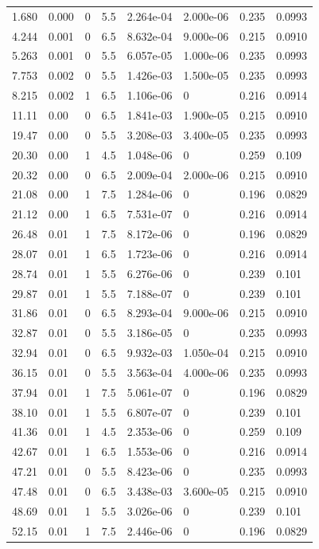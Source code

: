 \documentclass[preview]{standalone}
\begin{document}
{{\begin{tabular}{L{1.2cm}C{1.2cm} C{0.3cm}C{0.5cm} C{1.4cm}C{1.4cm} C{1.4cm}C{1.4cm}}
  1.680  &  0.000  & 0     & 5.5 &  2.264e-04  & 2.000e-06  & 0.235 &  0.0993   \\ 
  4.244  &  0.001  & 0     & 6.5 &  8.632e-04  & 9.000e-06  & 0.215 &  0.0910   \\ 
  5.263  &  0.001  & 0     & 5.5 &  6.057e-05  & 1.000e-06  & 0.235 &  0.0993   \\ 
  7.753  &  0.002  & 0     & 5.5 &  1.426e-03  & 1.500e-05  & 0.235 &  0.0993   \\ 
  8.215  &  0.002  & 1     & 6.5 &  1.106e-06  & 0  & 0.216 &  0.0914   \\ 
  11.11  &  0.00  & 0     & 6.5 &  1.841e-03  & 1.900e-05  & 0.215 &  0.0910   \\ 
  19.47  &  0.00  & 0     & 5.5 &  3.208e-03  & 3.400e-05  & 0.235 &  0.0993   \\ 
  20.30  &  0.00  & 1     & 4.5 &  1.048e-06  & 0  & 0.259 &  0.109   \\ 
  20.32  &  0.00  & 0     & 6.5 &  2.009e-04  & 2.000e-06  & 0.215 &  0.0910   \\ 
  21.08  &  0.00  & 1     & 7.5 &  1.284e-06  & 0  & 0.196 &  0.0829   \\ 
  21.12  &  0.00  & 1     & 6.5 &  7.531e-07  & 0  & 0.216 &  0.0914   \\ 
  26.48  &  0.01  & 1     & 7.5 &  8.172e-06  & 0  & 0.196 &  0.0829   \\ 
  28.07  &  0.01  & 1     & 6.5 &  1.723e-06  & 0  & 0.216 &  0.0914   \\ 
  28.74  &  0.01  & 1     & 5.5 &  6.276e-06  & 0  & 0.239 &  0.101   \\ 
  29.87  &  0.01  & 1     & 5.5 &  7.188e-07  & 0  & 0.239 &  0.101   \\ 
  31.86  &  0.01  & 0     & 6.5 &  8.293e-04  & 9.000e-06  & 0.215 &  0.0910   \\ 
  32.87  &  0.01  & 0     & 5.5 &  3.186e-05  & 0  & 0.235 &  0.0993   \\ 
  32.94  &  0.01  & 0     & 6.5 &  9.932e-03  & 1.050e-04  & 0.215 &  0.0910   \\ 
  36.15  &  0.01  & 0     & 5.5 &  3.563e-04  & 4.000e-06  & 0.235 &  0.0993   \\ 
  37.94  &  0.01  & 1     & 7.5 &  5.061e-07  & 0  & 0.196 &  0.0829   \\ 
  38.10  &  0.01  & 1     & 5.5 &  6.807e-07  & 0  & 0.239 &  0.101   \\ 
  41.36  &  0.01  & 1     & 4.5 &  2.353e-06  & 0  & 0.259 &  0.109   \\ 
  42.67  &  0.01  & 1     & 6.5 &  1.553e-06  & 0  & 0.216 &  0.0914   \\ 
  47.21  &  0.01  & 0     & 5.5 &  8.423e-06  & 0  & 0.235 &  0.0993   \\ 
  47.48  &  0.01  & 0     & 6.5 &  3.438e-03  & 3.600e-05  & 0.215 &  0.0910   \\ 
  48.69  &  0.01  & 1     & 5.5 &  3.026e-06  & 0  & 0.239 &  0.101   \\ 
  52.15  &  0.01  & 1     & 7.5 &  2.446e-06  & 0  & 0.196 &  0.0829   \\ 
\hline 
\end{tabular} 

}}
\end{document}

